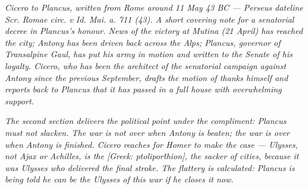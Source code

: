 
\textit{Cicero to Plancus, written from Rome around 11 May 43 BC
--- Perseus dateline \textit{Scr. Romae circ. v Id. Mai. a. 711
(43)}. A short covering note for a senatorial decree in
Plancus's honour. News of the victory at Mutina (21 April)
has reached the city; Antony has been driven back across the
Alps; Plancus, governor of Transalpine Gaul, has put his army
in motion and written to the Senate of his loyalty. Cicero,
who has been the architect of the senatorial campaign against
Antony since the previous September, drafts the motion of
thanks himself and reports back to Plancus that it has passed
in a full house with overwhelming support.}

\textit{The second section delivers the political point under
the compliment: Plancus must not slacken. The war is not over
when Antony is beaten; the war is over when Antony is
finished. Cicero reaches for Homer to make the case ---
Ulysses, not Ajax or Achilles, is the \textit{[Greek:
ptolipor\=thion]}, the sacker of cities, because it was
Ulysses who delivered the final stroke. The flattery is
calculated: Plancus is being told he can be the Ulysses of
this war if he closes it now.}
